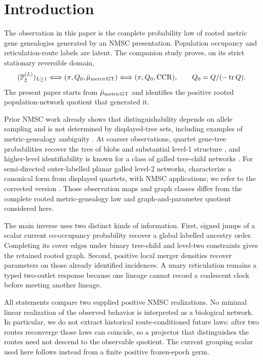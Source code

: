 \documentclass[11pt]{article}
\newcommand{\CCR}{\operatorname{CCR}}
\newcommand{\tr}{\operatorname{tr}}
\begin{document}
\section{Introduction}
The observation in this paper is the complete probability law of rooted metric gene genealogies generated by an NMSC presentation.  Population occupancy and reticulation-route labels are latent.  The companion study \citep{KriebelNMSCCore2026} proves, on its strict stationary reversible domain,
\begin{equation}
 (\mathbb P^{(L)}_\xi)_{L\ge1}
 \Longleftrightarrow
 (\pi,Q_0,\bar\mu_{\rm metricGT})
 \Longleftrightarrow
 (\pi,Q_0,\CCR),
 \qquad Q_0=Q/(-\tr Q).
 \label{eq:bridge}
\end{equation}
The present paper starts from $\bar\mu_{\rm metricGT}$ and identifies the positive rooted population-network quotient that generated it.

Prior NMSC work already shows that distinguishability depends on allele sampling and is not determined by displayed-tree sets, including examples of metric-genealogy ambiguity \citep{ZhuDegnan2017}.  At coarser observations, quartet gene-tree probabilities recover the tree of blobs and substantial level-1 structure \citep{AllmanBanosMitchellRhodes2023,AllmanBanosGarroteRhodes2024}, and higher-level identifiability is known for a class of galled tree-child networks \citep{AllmanAneBanosRhodes2025}.  For semi-directed outer-labelled planar galled level-2 networks, \citet{HoltgrefeEtAl2025} characterize a canonical form from displayed quartets, with NMSC applications; we refer to the corrected version \citep{HoltgrefeEtAl2026Correction}.  Those observation maps and graph classes differ from the complete rooted metric-genealogy law and graph-and-parameter quotient considered here.

The main inverse uses two distinct kinds of information.  First, signed
jumps of a scalar current co-occupancy probability recover a global labelled
ancestry order.  Completing its cover edges under binary tree-child and
level-two constraints gives the retained rooted graph.  Second, positive
local merger densities recover parameters on those already identified
incidences.  A unary reticulation remains a typed two-outlet response because
one lineage cannot record a coalescent clock before meeting another lineage.

All statements compare two supplied positive NMSC realizations.  No minimal
linear realization of the observed behavior is interpreted as a biological
network.  In particular, we do not extract historical route-conditioned
future laws: after two routes reconverge those laws can coincide, so a
projector that distinguishes the routes need not descend to the observable
quotient.  The current grouping scalar used here follows instead from a
finite positive frozen-epoch germ.
\end{document}
